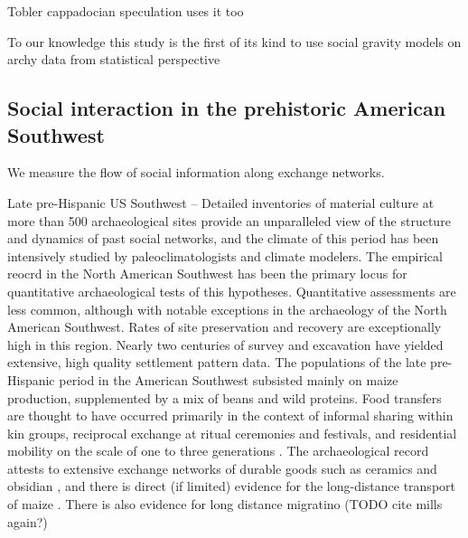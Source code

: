 \documentclass[fleqn,10pt]{wlscirep}
\begin{document}
Tobler cappadocian speculation uses it too

To our knowledge this study is the first of its kind to use social gravity models on archy data from statistical perspective


\subsection*{Social interaction in the prehistoric American Southwest}
 We measure the flow of social information along exchange networks.


Late pre-Hispanic US Southwest -- Detailed inventories of material culture at more than 500 archaeological sites provide an unparalleled view of the structure and dynamics of past social networks, and the climate of this period has been intensively studied by paleoclimatologists and climate modelers.
The empirical reocrd in the North American Southwest has been the primary locus for quantitative archaeological tests of this hypotheses. Quantitative assessments are less common, although with notable exceptions in the archaeology of the North American Southwest. Rates of site preservation and recovery are exceptionally high in this region. Nearly two centuries of survey and excavation have yielded extensive, high quality settlement pattern data. 
The populations of the late pre-Hispanic period in the American Southwest subsisted mainly on maize production, supplemented by a mix of beans and wild proteins. Food transfers are thought to have occurred primarily in the context of informal sharing within kin groups, reciprocal exchange at ritual ceremonies and festivals, and residential mobility on the scale of one to three generations \cite{Hegmon1991,Hegmon1996,Kohler1996TheAnasazi,Varien1999SedentismBeyond,Cordell2007MesaMigration}. The archaeological record attests to extensive exchange networks of durable goods such as ceramics and obsidian \cite{Mills2013a}, and there is direct (if limited) evidence for the long-distance transport of maize \cite{Benson2009PossibleMexico,Benson2010WhoDrought}. There is also evidence for long distance migratino (TODO cite mills again?)
\end{document}
